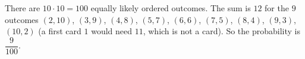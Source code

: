 There are $10\cdot10=100$ equally likely ordered outcomes. The sum is $12$ for the $9$ outcomes $(2,10)$, $(3,9)$, $(4,8)$, $(5,7)$, $(6,6)$, $(7,5)$, $(8,4)$, $(9,3)$, $(10,2)$ (a first card $1$ would need $11$, which is not a card). So the probability is $\boxed{\dfrac{9}{100}}$.
